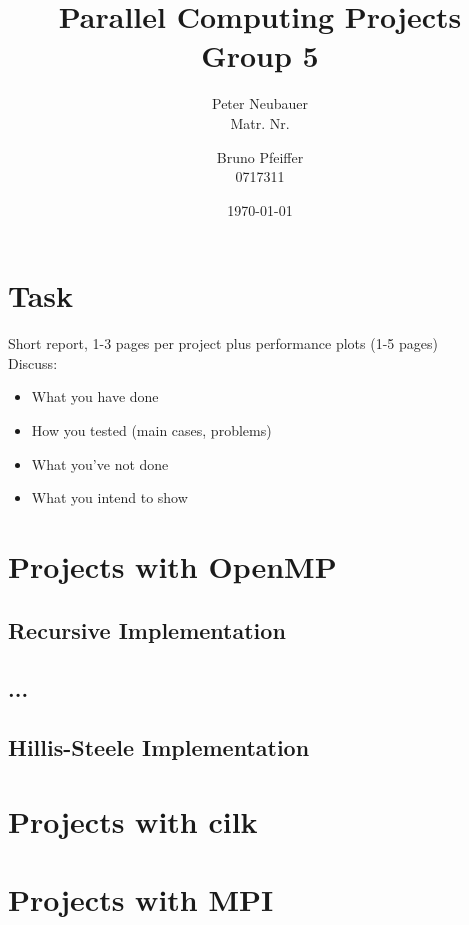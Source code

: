 \documentclass[11pt, draft]{article}
\begin{document}
\title{Parallel Computing Projects\\ Group 5}
\author{Peter Neubauer\\ Matr. Nr. \and Bruno Pfeiffer \\ 0717311}
\date{\today}
\maketitle
\newpage
\tableofcontents

\section{Task}
Short report, 1-3 pages per project plus performance plots (1-5 pages)\\
Discuss:
\begin{itemize}
\item What you have done
\item How you tested (main cases, problems)
\item What you've not done
\item What you intend to show
\end{itemize}


\section[OpenMP]{Projects with OpenMP}

\subsection{Recursive Implementation}

\subsection{...}

\subsection{Hillis-Steele Implementation}

\section[cilk]{Projects with cilk}

\section[MPI]{Projects with MPI}
\end{document}
